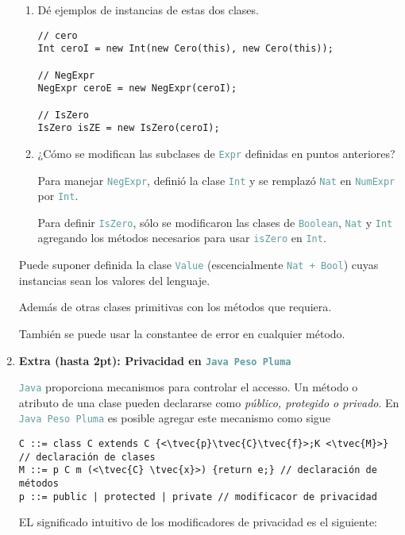 \documentclass{article}
\newcommand{\tx}[1]{\textcolor{Black} {\texttt{#1}}}
\newcommand{\tp}[1]{\textcolor{CadetBlue} {\texttt{#1}}}
\newcommand{\tb}[1]{\textcolor{RoyalPurple} {\textbf{#1}}}
\newcommand{\ti}[1]{\textcolor{RoyalPurple} {\textit{#1}}}
\newcommand{\pt}[1]{\textcolor{RoyalPurple}{(#1pt)}}
\newcommand{\tvec}[1]{$\vec{\tx{#1}}$ }
\begin{document}
\begin{enumerate}
\begin{enumerate}
            \item Dé ejemplos de instancias de estas dos clases.

            \begin{verbatim}
// cero
Int ceroI = new Int(new Cero(this), new Cero(this));

// NegExpr
NegExpr ceroE = new NegExpr(ceroI);

// IsZero
IsZero isZE = new IsZero(ceroI);
            \end{verbatim}

            \item ¿Cómo se modifican las subclases de \tp{Expr} definidas en
            puntos anteriores?

            Para manejar \tp{NegExpr}, definió la clase \tp{Int} y se remplazó
            \tp{Nat} en \tp{NumExpr} por \tp{Int}.

            Para definir \tp{IsZero}, sólo se modificaron las clases de
            \tp{Boolean}, \tp{Nat} y \tp{Int} agregando los métodos necesarios
            para usar \tp{isZero} en \tp{Int}.
        \end{enumerate}

        Puede suponer definida la clase \tp{Value} (escencialmente
        \tp{Nat + Bool}) cuyas instancias sean los valores del lenguaje.

        Además de otras clases primitivas con los métodos que requiera.

        También se puede usar la constantee de error en cualquier método.

        \item \tb{Extra \pt{hasta 2}: Privacidad en \tp{Java Peso Pluma}}

        \tp{Java} proporciona mecanismos para controlar el accesso. Un método o
        atributo de una clase pueden declararse como \ti{público, protegido o
        privado}. En \tp{Java Peso Pluma} es posible agregar este mecanismo como
        sigue

        \begin{verbatim}
C ::= class C extends C {<\tvec{p}\tvec{C}\tvec{f}>;K <\tvec{M}>} // declaración de clases
M ::= p C m (<\tvec{C} \tvec{x}>) {return e;} // declaración de métodos
p ::= public | protected | private // modificacor de privacidad
        \end{verbatim}

        EL significado intuitivo de los modificadores de privacidad es el
        siguiente:


\end{enumerate}
\end{document}
